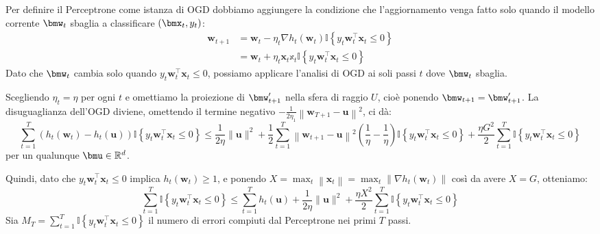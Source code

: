 \documentclass[\main/main.tex]{subfiles}
\begin{document}
\begin{analysis}
    Per definire il Perceptrone come istanza di OGD dobbiamo aggiungere la condizione che l'aggiornamento venga fatto solo quando il modello corrente \(\bmw_t\) sbaglia a classificare \(\rnd{\bmx_t, y_t}\):
    \begin{align*}
        \boldsymbol{w}_{t+1}&=\boldsymbol{w}_{t}-\eta_{t} \nabla h_{t}\left(\boldsymbol{w}_{t}\right) \mathbb{I}\left\{y_{t} \boldsymbol{w}_{t}^{\top} \boldsymbol{x}_{t} \leq 0\right\}\\&=\boldsymbol{w}_{t}+\eta_{t} \boldsymbol{x}_{t} \mathbb{x}_{t} \mathbb{I}\left\{y_{t} \boldsymbol{w}_{t}^{\top} \boldsymbol{x}_{t} \leq 0\right\}
    \end{align*}
    Dato che \(\bmw_t\) cambia solo quando \(y_{t} \boldsymbol{w}_{t}^{\top} \boldsymbol{x}_{t} \leq 0\), possiamo applicare l'analisi di OGD ai soli passi \(t\) dove \(\bmw_t\) sbaglia.
    
    Scegliendo \(\eta_t = \eta\) per ogni \(t\) e omettiamo la proiezione di \(\bmw'_{t+1}\) nella sfera di raggio \(U\), cioè ponendo \(\bmw_{t+1} = \bmw'_{t+1}\). La disuguaglianza dell'OGD diviene, omettendo il termine negativo \(-\frac{1}{2 \eta_{1}}\left\|\boldsymbol{w}_{T+1}-\boldsymbol{u}\right\|^{2}\), ci dà:
    \[
        \sum_{t=1}^{T}\left(h_{t}\left(\boldsymbol{w}_{t}\right)-h_{t}(\boldsymbol{u})\right) \mathbb{I}\left\{y_{t} \boldsymbol{w}_{t}^{\top} \boldsymbol{x}_{t} \leq 0\right\} \leq \frac{1}{2 \eta}\|\boldsymbol{u}\|^{2} +\frac{1}{2} \sum_{t=1}^{T}\left\|\boldsymbol{w}_{t+1}-\boldsymbol{u}\right\|^{2}\left(\frac{1}{\eta}-\frac{1}{\eta}\right) \mathbb{I}\left\{y_{t} \boldsymbol{w}_{t}^{\top} \boldsymbol{x}_{t} \leq 0\right\}+\frac{\eta G^{2}}{2} \sum_{t=1}^{T} \mathbb{I}\left\{y_{t} \boldsymbol{w}_{t}^{\top} \boldsymbol{x}_{t} \leq 0\right\}
    \]
    per un qualunque \(\bmu \in \R^d\).
    
    Quindi, dato che \(y_{t} \boldsymbol{w}_{t}^{\top} \boldsymbol{x}_{t} \leq 0\) implica \(h_{t}\left(\boldsymbol{w}_{t}\right) \geq 1\), e ponendo \(X=\max _{t}\left\|\boldsymbol{x}_{t}\right\|=\max _{t}\left\|\nabla h_{t}\left(\boldsymbol{w}_{t}\right)\right\|\) così da avere \(X = G\), otteniamo:
    \[
        \sum_{t=1}^{T} \mathbb{I}\left\{y_{t} \boldsymbol{w}_{t}^{\top} \boldsymbol{x}_{t} \leq 0\right\} \leq \sum_{t=1}^{T} h_{t}(\boldsymbol{u})+\frac{1}{2 \eta}\|\boldsymbol{u}\|^{2}+\frac{\eta X^{2}}{2} \sum_{t=1}^{T} \mathbb{I}\left\{y_{t} \boldsymbol{w}_{t}^{\top} \boldsymbol{x}_{t} \leq 0\right\}
    \]
    Sia \(M_{T}=\sum_{t=1}^{T} \mathbb{I}\left\{y_{t} \boldsymbol{w}_{t}^{\top} \boldsymbol{x}_{t} \leq 0\right\}\) il numero di errori compiuti dal Perceptrone nei primi \(T\) passi.
    

\end{analysis}
\end{document}
